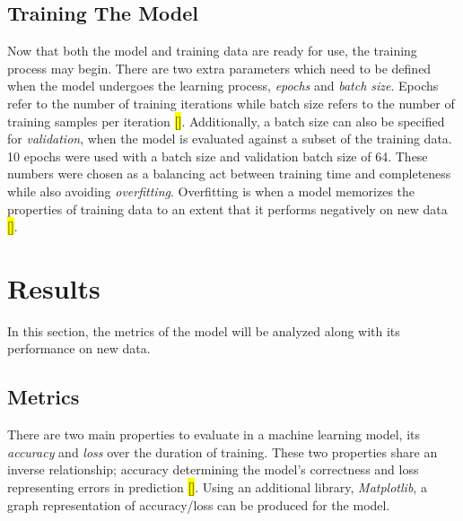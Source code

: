 \documentclass[11pt,conference]{IEEEtran}
\begin{document}
\subsection{Training The Model}
Now that both the model and training data are ready for use, the training 
process may begin. There are two extra parameters which need to be defined when
the model undergoes the learning process, \emph{epochs} and \emph{batch size}.
Epochs refer to the number of training iterations while batch size
refers to the number of training samples per iteration \hl{[]}. Additionally, a batch
size can also be specified for \emph{validation}, when the model is evaluated
against a subset of the training data. 10 epochs were used
with a batch size and validation batch size of 64. These numbers were chosen as a balancing act between
training time and completeness while also avoiding \emph{overfitting}.
Overfitting is when a model memorizes the properties of 
training data to an extent that it performs negatively on new data \hl{[]}. 

\section{Results}
In this section, the metrics of the model will be analyzed along with its
performance on new data.

\subsection{Metrics}
There are two main properties to evaluate in a machine learning model, its
\emph{accuracy} and \emph{loss} over the duration of training. These two
properties share an inverse relationship; accuracy determining the model's
correctness and loss representing errors in prediction \hl{[]}. Using an additional
library, \emph{Matplotlib}, a graph representation of accuracy/loss can be
produced for the model.
\end{document}
